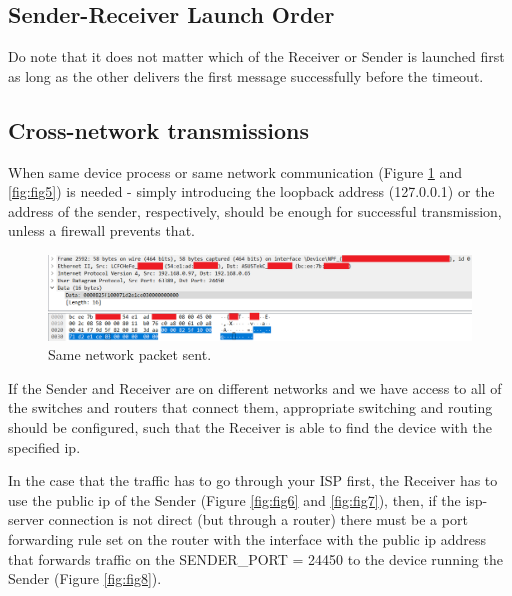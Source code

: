 \documentclass[12pt]{article}
\begin{document}
\subsection{Sender-Receiver Launch Order}

Do note that it does not matter which of the Receiver or Sender is launched first as long as the other delivers the first message successfully before the timeout.

\subsection{Cross-network transmissions}

When same device process or same network communication (Figure \ref{fig:fig4} and \ref{fig:fig5}) is needed - simply introducing the loopback address (127.0.0.1) or the address of the sender, respectively, should be enough for successful transmission, unless a firewall prevents that.

\begin{figure}[!htb]
	\centering
	\includegraphics[width=.7\linewidth]{LocalRequestSend.png}
	\caption{Same network packet sent.}\label{fig:fig4}
\end{figure}

If the Sender and Receiver are on different networks and we have access to all of the switches and routers that connect them, appropriate switching and routing should be configured, such that the Receiver is able to find the device with the specified ip.

In the case that the traffic has to go through your ISP first, the Receiver has to use the public ip of the Sender (Figure \ref{fig:fig6} and \ref{fig:fig7}), then, if the isp-server connection is not direct (but through a router) there must be a port forwarding rule set on the router with the interface with the public ip address that forwards traffic on the SENDER_PORT = 24450 to the device running the Sender (Figure \ref{fig:fig8}).
\end{document}
